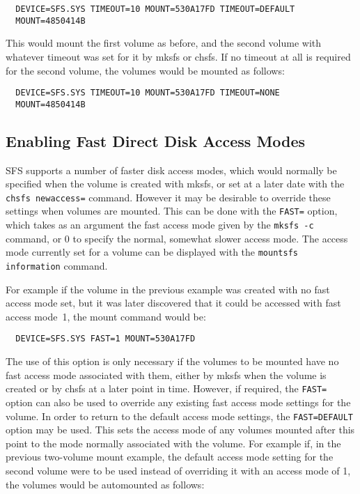 {\tt \verb|  |DEVICE=SFS.SYS TIMEOUT=10 MOUNT=530A17FD TIMEOUT=DEFAULT\\
     \verb|  |MOUNT=4850414B}

This would mount the first volume as before, and the second volume with
whatever timeout was set for it by mksfs or chsfs.  If no timeout at all is
required for the second volume, the volumes would be mounted as follows:

{\tt \verb|  |DEVICE=SFS.SYS TIMEOUT=10 MOUNT=530A17FD TIMEOUT=NONE\\
     \verb|  |MOUNT=4850414B}


\subsection{Enabling Fast Direct Disk Access Modes}

SFS supports a number of faster disk access modes, which would normally be
specified when the volume is created with mksfs, or set at a later date with
the {\tt chsfs newaccess=} command.  However it may be desirable to override these
settings when volumes are mounted.  This can be done with the {\tt FAST=} option, 
which takes as an argument the fast access mode given by the {\tt mksfs -c}
command, or 0 to specify the normal, somewhat slower access mode.  The access
mode currently set for a volume can be displayed with the {\tt mountsfs
information} command.

For example if the volume in the previous example was created with no fast
access mode set, but it was later discovered that it could be accessed with
fast access mode\ 1, the mount command would be:

\verb|  |{\tt DEVICE=SFS.SYS FAST=1 MOUNT=530A17FD}

The use of this option is only necessary if the volumes to be mounted have no 
fast access mode associated with them, either by mksfs when the volume is
created or by chsfs at a later point in time.  However, if required, the
{\tt FAST=} option can also be used to override any existing fast access mode
settings for the volume.  In order to return to the default access mode
settings, the {\tt FAST=DEFAULT} option may be used.  This sets the access mode of
any volumes mounted after this point to the mode normally associated with the 
volume.  For example if, in the previous two-volume mount example, the default 
access mode setting for the second volume were to be used instead of overriding 
it with an access mode of 1, the volumes would be automounted as follows:

